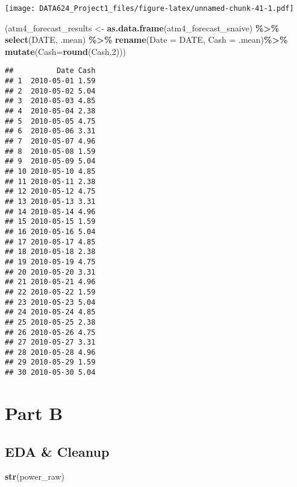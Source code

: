 \documentclass[
]{article}
\newenvironment{Shaded}{\begin{snugshade}}{\end{snugshade}}
\newcommand{\AttributeTok}[1]{\textcolor[rgb]{0.13,0.29,0.53}{#1}}
\newcommand{\DecValTok}[1]{\textcolor[rgb]{0.00,0.00,0.81}{#1}}
\newcommand{\FunctionTok}[1]{\textcolor[rgb]{0.13,0.29,0.53}{\textbf{#1}}}
\newcommand{\NormalTok}[1]{#1}
\newcommand{\OtherTok}[1]{\textcolor[rgb]{0.56,0.35,0.01}{#1}}
\newcommand{\SpecialCharTok}[1]{\textcolor[rgb]{0.81,0.36,0.00}{\textbf{#1}}}
\begin{document}
\texttt{[image: DATA624\_Project1\_files/figure-latex/unnamed-chunk-41-1.pdf]}

\begin{Shaded}
\begin{Highlighting}[]
\NormalTok{(atm4\_forecast\_results }\OtherTok{\textless{}{-}} 
  \FunctionTok{as.data.frame}\NormalTok{(atm4\_forecast\_snaive) }\SpecialCharTok{\%\textgreater{}\%}
    \FunctionTok{select}\NormalTok{(DATE, .mean) }\SpecialCharTok{\%\textgreater{}\%} 
      \FunctionTok{rename}\NormalTok{(}\AttributeTok{Date =}\NormalTok{ DATE, }\AttributeTok{Cash =}\NormalTok{ .mean)}\SpecialCharTok{\%\textgreater{}\%}
        \FunctionTok{mutate}\NormalTok{(}\AttributeTok{Cash=}\FunctionTok{round}\NormalTok{(Cash,}\DecValTok{2}\NormalTok{)))}
\end{Highlighting}
\end{Shaded}

\begin{verbatim}
##          Date Cash
## 1  2010-05-01 1.59
## 2  2010-05-02 5.04
## 3  2010-05-03 4.85
## 4  2010-05-04 2.38
## 5  2010-05-05 4.75
## 6  2010-05-06 3.31
## 7  2010-05-07 4.96
## 8  2010-05-08 1.59
## 9  2010-05-09 5.04
## 10 2010-05-10 4.85
## 11 2010-05-11 2.38
## 12 2010-05-12 4.75
## 13 2010-05-13 3.31
## 14 2010-05-14 4.96
## 15 2010-05-15 1.59
## 16 2010-05-16 5.04
## 17 2010-05-17 4.85
## 18 2010-05-18 2.38
## 19 2010-05-19 4.75
## 20 2010-05-20 3.31
## 21 2010-05-21 4.96
## 22 2010-05-22 1.59
## 23 2010-05-23 5.04
## 24 2010-05-24 4.85
## 25 2010-05-25 2.38
## 26 2010-05-26 4.75
## 27 2010-05-27 3.31
## 28 2010-05-28 4.96
## 29 2010-05-29 1.59
## 30 2010-05-30 5.04
\end{verbatim}

\hypertarget{part-b-1}{%
\section{Part B}\label{part-b-1}}

\hypertarget{eda-cleanup-1}{%
\subsection{EDA \& Cleanup}\label{eda-cleanup-1}}

\begin{Shaded}
\begin{Highlighting}[]
\FunctionTok{str}\NormalTok{(power\_raw)}
\end{Highlighting}
\end{Shaded}
\end{document}
